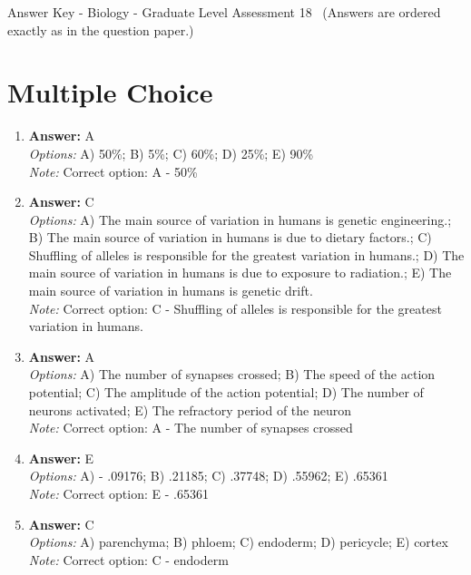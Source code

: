 \documentclass[12pt]{article}
\begin{document}
\begin{center}
Answer Key - Biology - Graduate Level Assessment 18 \
\small (Answers are ordered exactly as in the question paper.)
\end{center}

\section*{Multiple Choice}
\begin{enumerate}[label=\arabic*.]
\item \textbf{Answer:} A
\\ \textit{Options:} A) 50\%; B) 5\%; C) 60\%; D) 25\%; E) 90\%
\\ \textit{Note:} Correct option: A - 50\%
\item \textbf{Answer:} C
\\ \textit{Options:} A) The main source of variation in humans is genetic engineering.; B) The main source of variation in humans is due to dietary factors.; C) Shuffling of alleles is responsible for the greatest variation in humans.; D) The main source of variation in humans is due to exposure to radiation.; E) The main source of variation in humans is genetic drift.
\\ \textit{Note:} Correct option: C - Shuffling of alleles is responsible for the greatest variation in humans.
\item \textbf{Answer:} A
\\ \textit{Options:} A) The number of synapses crossed; B) The speed of the action potential; C) The amplitude of the action potential; D) The number of neurons activated; E) The refractory period of the neuron
\\ \textit{Note:} Correct option: A - The number of synapses crossed
\item \textbf{Answer:} E
\\ \textit{Options:} A) - .09176; B) .21185; C) .37748; D) .55962; E) .65361
\\ \textit{Note:} Correct option: E - .65361
\item \textbf{Answer:} C
\\ \textit{Options:} A) parenchyma; B) phloem; C) endoderm; D) pericycle; E) cortex
\\ \textit{Note:} Correct option: C - endoderm
\end{enumerate}
\end{document}
